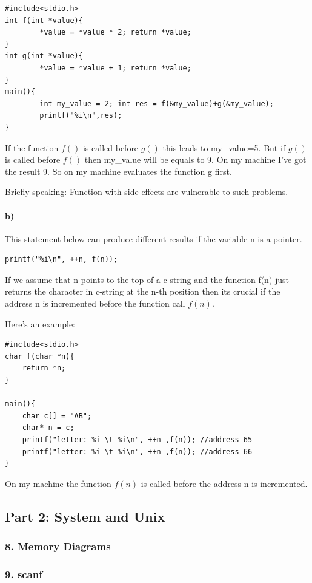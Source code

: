 \documentclass[12pt]{article}
\begin{document}
\begin{lstlisting}
#include<stdio.h>
int f(int *value){ 
        *value = *value * 2; return *value; 
}
int g(int *value){ 
        *value = *value + 1; return *value; 
}
main(){
        int my_value = 2; int res = f(&my_value)+g(&my_value);
        printf("%i\n",res);
}
\end{lstlisting}

If the function $f()$ is called before $g()$ this leads to my\_value=5. But if $g()$ is called before $f()$ then my\_value will be equals to 9.
On my machine I've got the result 9. So on my machine evaluates the function g first.

Briefly speaking: Function with side-effects are vulnerable to such problems.

\paragraph{b)}
This statement below can produce different results if the variable n is a pointer.
\begin{lstlisting}
printf("%i\n", ++n, f(n));
\end{lstlisting}

If we assume that n points to the top of a c-string and the function f(n) just returns the character in c-string at the n-th position then its crucial if the address n is incremented before the function call $f(n)$.

Here's an example:
\begin{lstlisting}
#include<stdio.h>
char f(char *n){
	return *n;
}

main(){
	char c[] = "AB";
	char* n = c;
	printf("letter: %i \t %i\n", ++n ,f(n)); //address 65
	printf("letter: %i \t %i\n", ++n ,f(n)); //address 66
}
\end{lstlisting}
On my machine the function $f(n)$ is called before the address n is incremented.

\subsection*{Part 2: System and Unix}
\subsubsection*{8. Memory Diagrams}

\subsubsection*{9. scanf}
\end{document}
